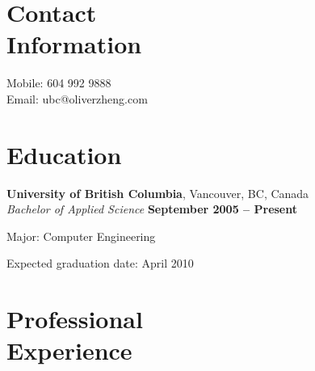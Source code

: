 \documentclass[margin,line]{resume}
\begin{document}
\begin{resume}

    \section{\mysidestyle Contact\\Information}

    Mobile: 604 992 9888       %
        \vspace{0mm}\\\vspace{0mm}%
    Email: ubc@oliverzheng.com %

    \section{\mysidestyle Education}

    \textbf{University of British Columbia}, Vancouver, BC, Canada
        \vspace{2mm}\\\vspace{1mm}%
    \textsl{Bachelor of Applied Science} \hfill \textbf{September 2005 -- Present}
        \vspace{-3mm}\\\vspace{-1mm}%
    \begin{list2}
        \item Major: Computer Engineering
        \item Expected graduation date: April 2010
    \end{list2}
    \vspace{-1.5mm}

    \section{\mysidestyle Professional\\Experience}


\end{resume}
\end{document}
